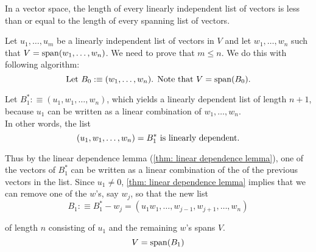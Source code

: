 \begin{thm}  
  \label{thm: length of linearly dependent list less or equal to length of spanning list}
  In a \fd vector space, the length of every linearly independent list of vectors is less than or equal to the length of every spanning list of vectors.
\end{thm}
\begin{prf}
  Let $u_1, \ldots, u_m$ be a linearly independent list of vectors in $V$ and let $w_1, \ldots, w_n$ such that $V=\operatorname{span} (w_1, \ldots, w_n)$. We need to prove that $m \leq n$. We do this with following algorithm:
  \begin{equation*}
      $Let $B_0 :\equiv  (w_1, \ldots, w_n)$. Note that $V=\myspan{B_0}.
  \end{equation*}

   Let $B_1^* :\equiv (u_1, w_1, \ldots, w_n)$, which yields a linearly dependent list of length $n+1$, because $u_1$ can be written as a linear combination of $w_1, \ldots, w_n$. \\
  In other words, the list
  \begin{equation*}
    (u_1, w_1, \ldots, w_n) = B_1^* $ is linearly dependent.$
  \end{equation*}

  Thus by the linear dependence lemma (\ref{thm: linear dependence lemma}), one of the vectors of $B_1^*$ can be written as a linear combination of the of the previous vectors in the list. Since $u_1 \neq 0$, \ref{thm: linear dependence lemma} implies that we can remove one of the $w$'s, say $w_j$, so that the new list
  \begin{equation*}
    B_1 :\equiv B_1^* - {w_j} = (u_1 w_1, \ldots, w_{j-1}, w_{j+1}, \ldots, w_n)
  \end{equation*}

  of length $n$ consisting of $u_1$ and the remaining $w$'s spans $V$.
  \begin{equation*}
    V=\operatorname{span} (B_1)
  \end{equation*}


\end{prf}
